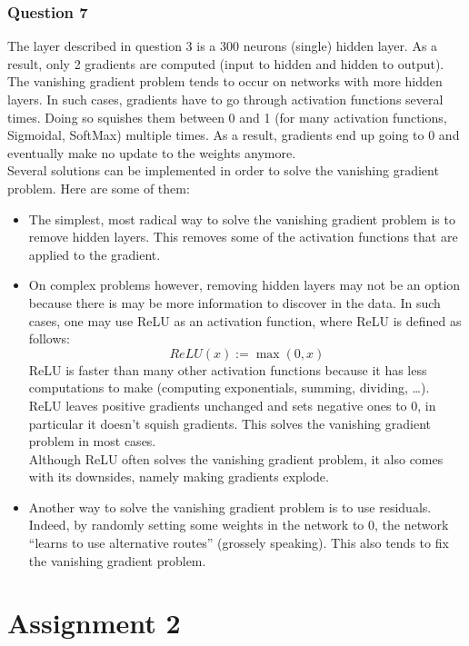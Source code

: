 \documentclass[12pt]{article}
\begin{document}
\subsubsection{Question 7}
The layer described in question 3 is a 300 neurons (single) hidden layer. As a result, only 2 gradients are computed (input to hidden and hidden to output). The vanishing gradient problem tends to occur on networks with more hidden layers. In such cases, gradients have to go through activation functions several times. Doing so squishes them between 0 and 1 (for many activation functions, \eg Sigmoidal, SoftMax) multiple times. As a result, gradients end up going to 0 and eventually make no update to the weights anymore. \\
Several solutions can be implemented in order to solve the vanishing gradient problem. Here are some of them:
\begin{itemize}
  \item The simplest, most radical way to solve the vanishing gradient problem is to remove hidden layers. This removes some of the activation functions that are applied to the gradient.
  \item On complex problems however, removing hidden layers may not be an option because there is may be more information to discover in the data. In such cases, one may use ReLU as an activation function, where ReLU is defined as follows:
        $$
          ReLU(x) := \max (0, x)
        $$
        ReLU is faster than many other activation functions because it has less computations to make (computing exponentials, summing, dividing, \ldots). ReLU leaves positive gradients unchanged and sets negative ones to 0, in particular it doesn't squish gradients. This solves the vanishing gradient problem in most cases. \\
        Although ReLU often solves the vanishing gradient problem, it also comes with its downsides, namely making gradients explode.
  \item Another way to solve the vanishing gradient problem is to use residuals. Indeed, by randomly setting some weights in the network to 0, the network ``learns to use alternative routes'' (grossely speaking). This also tends to fix the vanishing gradient problem.
\end{itemize}



\section{Assignment 2}
\end{document}
